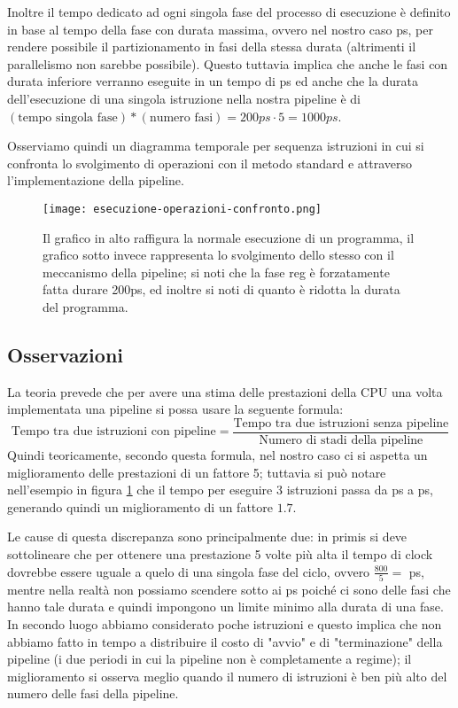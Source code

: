 Inoltre il tempo dedicato ad ogni singola fase del processo di esecuzione è definito in base al tempo della fase con durata massima, ovvero nel nostro caso \unit[200]{ps}, per rendere possibile il partizionamento in fasi della stessa durata (altrimenti il parallelismo non sarebbe possibile).
Questo tuttavia implica che anche le fasi con durata inferiore verranno eseguite in un tempo di \unit[200]{ps} ed anche che la durata dell'esecuzione di una singola istruzione nella nostra pipeline è di \((\textrm{tempo singola fase})*(\textrm{numero fasi})=200ps\cdot 5=1000ps\).

Osserviamo quindi un diagramma temporale per sequenza istruzioni in cui si confronta lo svolgimento di operazioni con il metodo standard e attraverso l'implementazione della pipeline.
\begin{figure}[H]
	\centering
	\texttt{[image: esecuzione-operazioni-confronto.png]}
	\caption{\label{esempioPipeline}Il grafico in alto raffigura la normale esecuzione di un programma, il grafico sotto invece rappresenta lo svolgimento dello stesso con il meccanismo della pipeline; si noti che la fase reg è forzatamente fatta durare 200ps, ed inoltre si noti di quanto è ridotta la durata del programma.}
\end{figure}

\subsection{Osservazioni}
La teoria prevede che per avere una stima delle prestazioni della CPU una volta implementata una pipeline si possa usare la seguente formula:
\begin{equation*}
\text{Tempo tra due istruzioni con pipeline} = \frac{\text{Tempo tra due istruzioni senza pipeline}}{\text{Numero di stadi della pipeline}}
\end{equation*}
Quindi teoricamente, secondo questa formula, nel nostro caso ci si aspetta un miglioramento delle prestazioni di un fattore 5; tuttavia si può notare nell'esempio in figura \ref{esempioPipeline} che il tempo per eseguire 3 istruzioni passa da \unit[2400]{ps} a \unit[1400]{ps}, generando quindi un miglioramento di un fattore \(1.7\).

Le cause di questa discrepanza sono principalmente due: in primis si deve sottolineare che per ottenere una prestazione 5 volte più alta il tempo di clock dovrebbe essere uguale a quelo di una singola fase del ciclo, ovvero \(\frac{800}{5}=\) \unit[160]{ps}, mentre nella realtà non possiamo scendere sotto ai \unit[200]{ps} poiché ci sono delle fasi che hanno tale durata e quindi impongono un limite minimo alla durata di una fase. In secondo luogo abbiamo considerato poche istruzioni e questo implica che non abbiamo fatto in tempo a distribuire il costo di "avvio" e di "terminazione" della pipeline (i due periodi in cui la pipeline non è completamente a regime); il miglioramento si osserva meglio quando il numero di istruzioni è ben più alto del numero delle fasi della pipeline.

